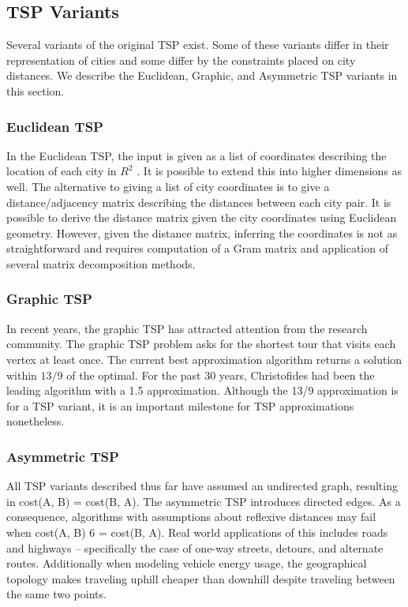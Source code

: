 \documentclass[10pt,twocolumn,letterpaper]{article}
\begin{document}
\subsection{TSP Variants}
Several variants of the original TSP exist. Some of these
variants differ in their representation of cities and some differ
by the constraints placed on city distances. We describe the
Euclidean, Graphic, and Asymmetric TSP variants in this
section.
\subsubsection{Euclidean TSP}
In the Euclidean TSP, the input is given as a list of coordinates describing the location of each city in $R^2$ \cite{arora1996polynomial}. It is
possible to extend this into higher dimensions as well. The
alternative to giving a list of city coordinates is to give a
distance/adjacency matrix describing the distances between
each city pair. It is possible to derive the distance matrix given the city coordinates using Euclidean geometry.
However, given the distance matrix, inferring the coordinates is not as straightforward and requires computation of
a Gram matrix and application of several matrix decomposition methods.

\subsubsection{Graphic TSP}
In recent years, the graphic TSP has attracted attention
from the research community. The graphic TSP problem
asks for the shortest tour that visits each vertex at least
once. The current best approximation algorithm returns a
solution within $13/9$ of the optimal\cite{mucha2014frac}. For the
past 30 years, Christofides had been the leading algorithm
with a 1.5 approximation. Although the 13/9 approximation
is for a TSP variant, it is an important milestone for TSP
approximations nonetheless.

\subsubsection{Asymmetric TSP}
All TSP variants described thus far have assumed an undirected graph, resulting in cost(A, B) = cost(B, A). The
asymmetric TSP introduces directed edges. As a consequence, algorithms with assumptions about reflexive distances may fail when cost(A, B) 6 = cost(B, A). Real world
applications of this includes roads and highways – specifically the case of one-way streets, detours, and alternate
routes. Additionally when modeling vehicle energy usage,
the geographical topology makes traveling uphill cheaper
than downhill despite traveling between the same two points.
\end{document}

